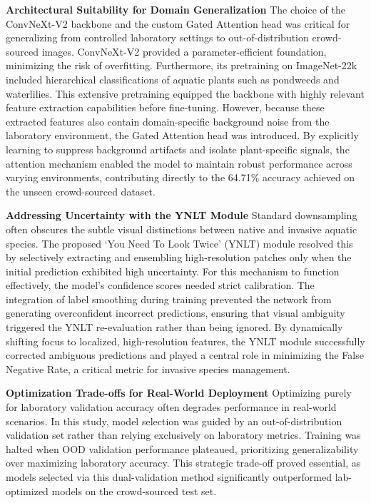 \documentclass[final,3p,times,twocolumn]{elsarticle}
\begin{document}
\textbf{Architectural Suitability for Domain Generalization}
The choice of the ConvNeXt-V2 backbone and the custom Gated Attention head was critical for generalizing from controlled laboratory settings to out-of-distribution crowd-sourced images. ConvNeXt-V2 provided a parameter-efficient foundation, minimizing the risk of overfitting. Furthermore, its pretraining on ImageNet-22k included hierarchical classifications of aquatic plants such as pondweeds and waterlilies. This extensive pretraining equipped the backbone with highly relevant feature extraction capabilities before fine-tuning. However, because these extracted features also contain domain-specific background noise from the laboratory environment, the Gated Attention head was introduced. By explicitly learning to suppress background artifacts and isolate plant-specific signals, the attention mechanism enabled the model to maintain robust performance across varying environments, contributing directly to the 64.71\% accuracy achieved on the unseen crowd-sourced dataset.

\textbf{Addressing Uncertainty with the YNLT Module}
Standard downsampling often obscures the subtle visual distinctions between native and invasive aquatic species. The proposed `You Need To Look Twice' (YNLT) module resolved this by selectively extracting and ensembling high-resolution patches only when the initial prediction exhibited high uncertainty. For this mechanism to function effectively, the model's confidence scores needed strict calibration. The integration of label smoothing during training prevented the network from generating overconfident incorrect predictions, ensuring that visual ambiguity triggered the YNLT re-evaluation rather than being ignored. By dynamically shifting focus to localized, high-resolution features, the YNLT module successfully corrected ambiguous predictions and played a central role in minimizing the False Negative Rate, a critical metric for invasive species management.

\textbf{Optimization Trade-offs for Real-World Deployment}
Optimizing purely for laboratory validation accuracy often degrades performance in real-world scenarios. In this study, model selection was guided by an out-of-distribution validation set rather than relying exclusively on laboratory metrics. Training was halted when OOD validation performance plateaued, prioritizing generalizability over maximizing laboratory accuracy. This strategic trade-off proved essential, as models selected via this dual-validation method significantly outperformed lab-optimized models on the crowd-sourced test set. 
\end{document}
